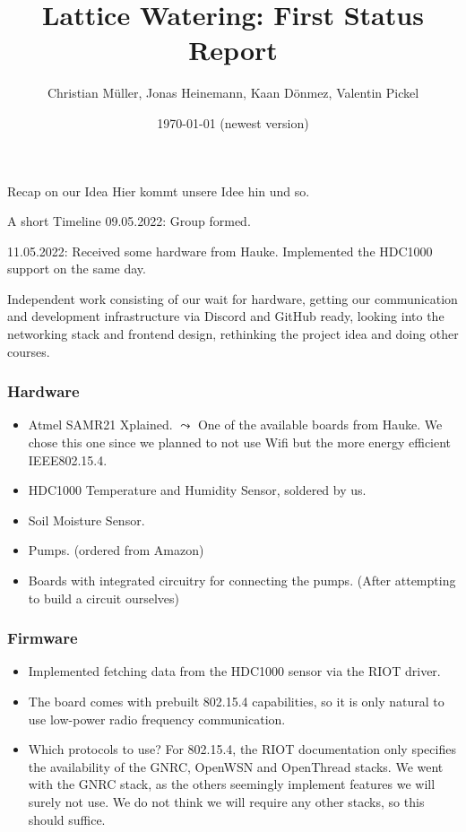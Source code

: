 \documentclass[10pt, xcolor=svgnames]{beamer}
\title{Lattice Watering: First Status Report}
\author{Christian Müller, Jonas Heinemann, Kaan Dönmez, Valentin Pickel}
\institute{
    Software Project on Internet Communication

    Summer Term 2022
    
    Freie Universität Berlin

    Institute for Computer Science
}
\date{\today{ }(newest version)}
\begin{document}
\maketitle

\begin{frame}{Recap on our Idea}
    Hier kommt unsere Idee hin und so.
\end{frame}

\begin{frame}{A short Timeline}
    09.05.2022: Group formed.

    \vspace*{0.25cm}

    11.05.2022: Received some hardware from Hauke. Implemented the HDC1000 support on the same day.

    \vspace*{0.25cm}

    Independent work consisting of our wait for hardware, getting our communication and development infrastructure via Discord and GitHub ready, looking into the networking stack and frontend design, rethinking the project idea and doing other courses.

    \vspace*{0.25cm}
\end{frame}

\begin{frame}
    \frametitle{Hardware}

    \begin{itemize}
        \item Atmel SAMR21 Xplained. \(\leadsto\) One of the available boards from Hauke. We chose this one since we planned to not use Wifi but the more energy efficient IEEE802.15.4.
        \item HDC1000 Temperature and Humidity Sensor, soldered by us.
        \item Soil Moisture Sensor.
        \item Pumps. (ordered from Amazon)
        \item Boards with integrated circuitry for connecting the pumps. (After attempting to build a circuit ourselves)
    \end{itemize}
\end{frame}

\begin{frame}
    \frametitle{Firmware}

    \begin{itemize}
        \item Implemented fetching data from the HDC1000 sensor via the RIOT driver.
        \item The board comes with prebuilt 802.15.4 capabilities, so it is only natural to use low-power radio frequency communication.
        \item Which protocols to use? For 802.15.4, the RIOT documentation only specifies the availability of the GNRC, OpenWSN and OpenThread stacks. We went with the GNRC stack, as the others seemingly implement features we will surely not use. We do not think we will require any other stacks, so this should suffice.
    \end{itemize}
\end{frame}
\end{document}
